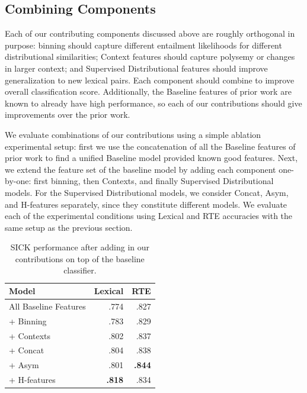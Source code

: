 \subsection{Combining Components}

Each of our contributing components discussed above are roughly orthogonal
in purpose: binning should capture different entailment likelihoods for
different distributional similarities; Context features should capture
polysemy or changes in larger context; and Supervised Distributional features
should improve generalization to new lexical pairs. Each component should
combine to improve overall classification score. Additionally, the Baseline
features of prior work are known to already have high performance, so each
of our contributions should give improvements over the prior work.

We evaluate combinations of our contributions using a simple ablation
experimental setup: first we use the concatenation of all the Baseline features
of prior work to find a unified Baseline model provided known good features.
Next, we extend the feature set of the baseline model by adding each component
one-by-one: first binning, then Contexts, and finally Supervised Distributional
models. For the Supervised Distributional models, we consider Concat, Asym,
and H-features separately, since they constitute different models. We evaluate
each of the experimental conditions using Lexical and RTE accuracies with the
same setup as the previous section.

\begin{table}
  \centering
  \begin{tabular}{|l|rr|}
  \hline
  {\bf Model}                & {\bf Lexical} &     {\bf RTE}  \\
  \hline\hline
  All Baseline Features       &      .774     &        .827   \\
  \hline
  + Binning                   &      .783     &        .829   \\
  \quad + Contexts            &      .802     &        .837   \\
  \quad\quad + Concat         &      .804     &        .838   \\
  \quad\quad + Asym           &      .801     &    {\bf.844}  \\
  \quad\quad + H-features     &  {\bf.818}    &        .834   \\
  \hline
  \end{tabular}
  \caption{SICK performance after adding in our contributions on top of the baseline classifier.}
  \label{tab:contribrte}
\end{table}

